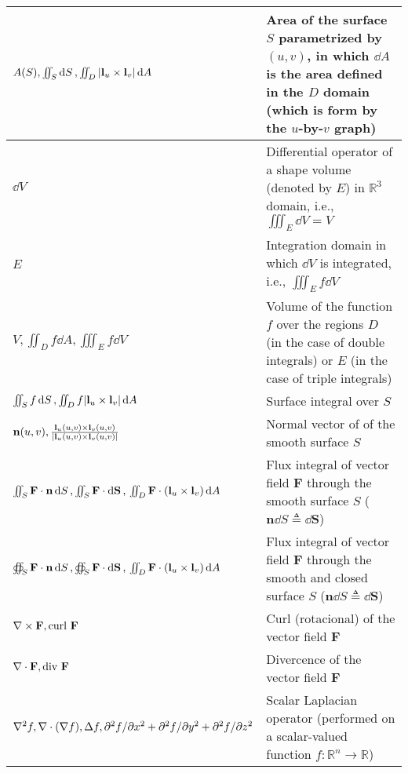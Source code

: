 \documentclass{article}
\begin{document}
\begin{xltabular}{\textwidth}{XX}
    \(A(S), \iint_S \dd{S}, \iint_D \abs{\mathbf{l}_u\times\mathbf{l}_v} \dd{A}\) & Area of the surface \(S\) parametrized by \((u,v)\), in which \(\dd{A}\) is the area defined in the \(D\) domain (which is form by the \(u\)-by-\(v\) graph)\\ \hline
    \(\dd{V}\) & Differential operator of a shape volume (denoted by \(E\)) in \(\mathbb{R}^3\) domain, i.e., \(\iiint_E \dd{V} = V\) \\ \hline
    \(E\) & Integration domain in which \(\dd{V}\) is integrated, i.e., \(\iiint_E f \dd{V}\) \cite{stewartCalculus2011} \\ \hline
    \(V, \iint_D f \dd{A}, \iiint_E f \dd{V}\) & Volume of the function \(f\) over the regions \(D\) (in the case of double integrals) or \(E\) (in the case of triple integrals) \\ \hline
    \(\iint_S f \dd{S}, \iint_D f \abs{\mathbf{l}_u\times\mathbf{l}_v} \dd{A}\)& Surface integral over \(S\) \\ \hline
    \(\mathbf{n}(u,v), \frac{\mathbf{l}_u(u,v)\times\mathbf{l}_v(u,v)}{\abs{\mathbf{l}_u(u,v)\times\mathbf{l}_v(u,v)}}\) & Normal vector of of the smooth surface \(S\) \\ \hline
    \(\iint_S \mathbf{F}\cdot \mathbf{n} \dd{S}, \iint_S \mathbf{F} \cdot \dd{\mathbf{S}}, \newline \iint_D \mathbf{F} \cdot (\mathbf{l}_u\times\mathbf{l}_v) \dd{A}\) & Flux integral of vector field \(\mathbf{F}\) through the smooth surface \(S\) (\(\mathbf{n} \dd{S} \triangleq \dd{\mathbf{S}}\)) \\ \hline
    \(\oiint_S \mathbf{F}\cdot \mathbf{n} \dd{S}, \oiint_S \mathbf{F} \cdot \dd{\mathbf{S}}, \newline \iint_D \mathbf{F} \cdot (\mathbf{l}_u\times\mathbf{l}_v) \dd{A}\) & Flux integral of vector field \(\mathbf{F}\) through the smooth and closed surface \(S\) (\(\mathbf{n} \dd{S} \triangleq \dd{\mathbf{S}}\)) \\ \hline
    \(\nabla \times \mathbf{F} , \textnormal{curl } \mathbf{F}\) & Curl (rotacional) of the vector field \(\mathbf{F}\)\\ \hline
    \(\nabla \cdot \mathbf{F} , \textnormal{div } \mathbf{F}\) & Divercence of the vector field \(\mathbf{F}\)\\ \hline
    \(\nabla^2 f, \nabla \cdot (\nabla f), \Delta f, \newline \partial^2f/\partial x^2 + \partial^2f/\partial y^2 + \partial^2f/\partial z^2\) & Scalar Laplacian operator (performed on a scalar-valued function \(f: \mathbb{R}^{n} \rightarrow \mathbb{R}\))\\ \hline

\end{xltabular}
\end{document}
